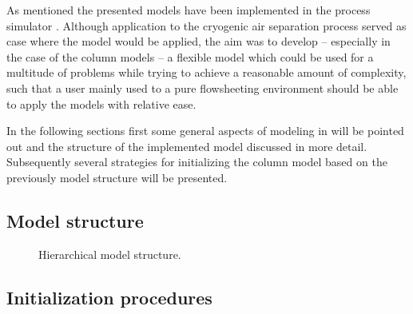 ﻿As mentioned the presented models have been implemented in the process simulator \gproms. Although application 
to the cryogenic air separation process served as case where the model would be applied, the aim was to develop 
-- especially in the case of the column models -- a flexible model which could be used for a multitude of 
problems while trying to achieve a reasonable amount of complexity, such that a user mainly used to a pure flowsheeting 
environment should be able to apply the models with relative ease. 

In the following sections first some general aspects of modeling in \gproms will be pointed out and the structure 
of the implemented model discussed in more detail. Subsequently several strategies for initializing the column model 
based on the previously model structure will be presented.  

\subsection{Model structure}
    \begin{figure}
        \center
        
        \caption{Hierarchical model structure.}
        \label{fig:mathpro:modelstruct}
    \end{figure}

\subsection{Initialization procedures}
